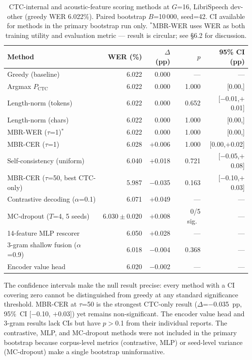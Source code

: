 \begin{table}[t]
\centering
\small
\caption{CTC-internal and acoustic-feature scoring methods at $G$=16, LibriSpeech dev-other
(greedy WER 6.022\%). Paired bootstrap $B$=10\,000, seed=42. CI available for methods in the
primary bootstrap run only. ${}^{*}$MBR-WER uses WER as both training utility and evaluation
metric — result is circular; see §6.2 for discussion.}
\label{tab:ctc-internal-full}
\begin{tabular}{lrrrr}
\hline
Method & WER (\%) & $\Delta$ (pp) & $p$ & 95\% CI (pp) \\
\hline
Greedy (baseline)                     & 6.022         & 0.000    & ---       & --- \\
Argmax $P_{\text{CTC}}$               & 6.022         & 0.000    & 1.000     & [0.00,\;0.00] \\
Length-norm (tokens)                   & 6.022         & 0.000    & 0.652     & [$-$0.01,\;$+$0.01] \\
Length-norm (chars)                    & 6.022         & 0.000    & 1.000     & [0.00,\;0.00] \\
MBR-WER ($\tau$=1)$^{*}$             & 6.022         & 0.000    & 1.000     & [0.00,\;0.00] \\
MBR-CER ($\tau$=1)                    & 6.028         & $+$0.006 & 1.000     & [0.00,\;$+$0.02] \\
Self-consistency (uniform)             & 6.040         & $+$0.018 & 0.721     & [$-$0.05,\;$+$0.08] \\
MBR-CER ($\tau$=50, best CTC-only)    & 5.987         & $-$0.035 & 0.163     & [$-$0.10,\;$+$0.03] \\
\hline
Contrastive decoding ($\alpha$=0.1)   & 6.071         & $+$0.049 & ---       & --- \\
MC-dropout ($T$=4, 5 seeds)           & $6.030\pm0.020$ & $+$0.008 & 0/5 sig.\ & --- \\
14-feature MLP rescorer               & 6.050         & $+$0.028 & ---       & --- \\
3-gram shallow fusion ($\alpha$=0.9)  & 6.018         & $-$0.004 & 0.368     & --- \\
Encoder value head                    & 6.020         & $-$0.002 & ---       & --- \\
\hline
\end{tabular}
\end{table}

The confidence intervals make the null result precise: every method with a CI covering zero
cannot be distinguished from greedy at any standard significance threshold. MBR-CER at $\tau$=50
is the strongest CTC-only result ($\Delta$=$-$0.035~pp, 95\%\ CI [$-$0.10, $+$0.03]) yet
remains non-significant. The encoder value head and 3-gram results lack CIs but have $p$$>$0.1
from their individual reports. The contrastive, MLP, and MC-dropout methods were not included in
the primary bootstrap because corpus-level metrics (contrastive, MLP) or seed-level variance
(MC-dropout) make a single bootstrap uninformative.



